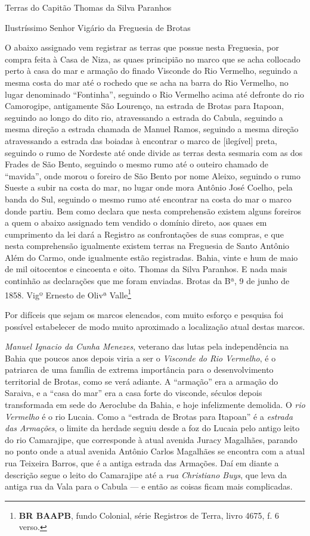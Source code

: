 \begin{citacao}
Terras do Capitão Thomas da Silva Paranhos

Ilustríssimo Senhor Vigário da Freguesia de Brotas

O abaixo assignado vem registrar as terras que possue nesta Freguesia, por compra feita à Casa de Niza, as quaes principião no marco que se acha collocado perto à casa do mar e armação do finado Visconde do Rio Vermelho, seguindo a mesma costa do mar até o rochedo que se acha na barra do Rio Vermelho, no lugar denominado ``Fontinha'', seguindo o Rio Vermelho acima até defronte do rio Camorogipe, antigamente São Lourenço, na estrada de Brotas para Itapoan, seguindo ao longo do dito rio, atravessando a estrada do Cabula, seguindo a mesma direção a estrada chamada de Manuel Ramos, seguindo a mesma direção atravessando a estrada das boiadas à encontrar o marco de [{ilegível}] preta, seguindo o rumo de Nordeste até onde divide as terras desta sesmaria com as dos Frades de São Bento, seguindo o mesmo rumo até o outeiro chamado de ``mavida'', onde morou o foreiro de São Bento por nome Aleixo, seguindo o rumo Sueste a subir na costa do mar, no lugar onde mora Antônio José Coelho, pela banda do Sul, seguindo o mesmo rumo até encontrar na costa do mar o marco donde partiu. Bem como declara que nesta comprehensão existem alguns foreiros a quem o abaixo assignado tem vendido o domínio direto, aos quaes em cumprimento da lei dará a Registro as confrontações de suas compras, e que nesta comprehensão igualmente existem terras na Freguesia de Santo Antônio Além do Carmo, onde igualmente estão registradas. Bahia, vinte e hum de maio de mil oitocentos e cincoenta e oito. Thomas da Silva Paranhos. E nada mais continhão as declarações que me foram enviadas. Brotas da Bª, 9 de junho de 1858. Vigº Ernesto de Olivª Valle\footnote{\textbf{BR BAAPB}, fundo Colonial, série Registros de Terra, livro 4675, f. 6 verso.}
\end{citacao}

Por difíceis que sejam os marcos elencados, com muito esforço e pesquisa foi possível estabelecer de modo muito aproximado a localização atual destas marcos.

\textit{Manuel Ignacio da Cunha Menezes}, veterano das lutas pela independência na Bahia que poucos anos depois viria a ser o \textit{Visconde do Rio Vermelho}, é o patriarca de uma família de extrema importância para o desenvolvimento territorial de Brotas, como se verá adiante. A ``armação'' era a armação do Saraiva, e a ``casa do mar'' era a casa forte do visconde, séculos depois transformada em sede do Aeroclube da Bahia, e hoje infelizmente demolida. O \textit{rio Vermelho} é o rio Lucaia. Como a ``estrada de Brotas para Itapoan'' é a \textit{estrada das Armações}, o limite da herdade seguiu desde a foz do Lucaia pelo antigo leito do rio Camarajipe, que corresponde à atual avenida Juracy Magalhães, parando no ponto onde a atual avenida Antônio Carlos Magalhães se encontra com a atual rua Teixeira Barros, que é a antiga estrada das Armações. Daí em diante a descrição segue o leito do Camarajipe até a \textit{rua Christiano Buys}, que leva da antiga rua da Vala para o Cabula --- e então as coisas ficam mais complicadas.

